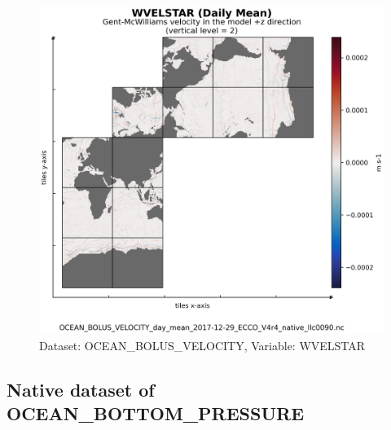 \begin{figure}[H]
\centering
\includegraphics[scale=0.55]{../images/plots/native_plots/Gent-McWilliams_Ocean_Bolus_Velocity/WVELSTAR.png}
\caption{Dataset: OCEAN\_BOLUS\_VELOCITY, Variable: WVELSTAR}
\label{tab:table-OCEAN_BOLUS_VELOCITY_WVELSTAR-Plot}
\end{figure}
\newpage
\subsection{Native dataset of OCEAN\_BOTTOM\_PRESSURE}
\newp
